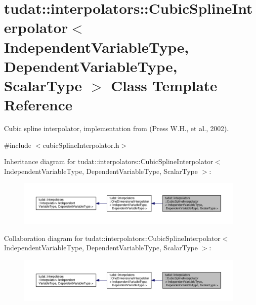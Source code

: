\hypertarget{classtudat_1_1interpolators_1_1CubicSplineInterpolator}{}\section{tudat\+:\+:interpolators\+:\+:Cubic\+Spline\+Interpolator$<$ Independent\+Variable\+Type, Dependent\+Variable\+Type, Scalar\+Type $>$ Class Template Reference}
\label{classtudat_1_1interpolators_1_1CubicSplineInterpolator}


Cubic spline interpolator, implementation from (Press W.\+H., et al., 2002).  




{\ttfamily \#include $<$cubic\+Spline\+Interpolator.\+h$>$}



Inheritance diagram for tudat\+:\+:interpolators\+:\+:Cubic\+Spline\+Interpolator$<$ Independent\+Variable\+Type, Dependent\+Variable\+Type, Scalar\+Type $>$\+:
\nopagebreak
\begin{figure}[H]
\begin{center}
\leavevmode
\includegraphics[width=350pt]{classtudat_1_1interpolators_1_1CubicSplineInterpolator__inherit__graph}
\end{center}
\end{figure}


Collaboration diagram for tudat\+:\+:interpolators\+:\+:Cubic\+Spline\+Interpolator$<$ Independent\+Variable\+Type, Dependent\+Variable\+Type, Scalar\+Type $>$\+:
\nopagebreak
\begin{figure}[H]
\begin{center}
\leavevmode
\includegraphics[width=350pt]{classtudat_1_1interpolators_1_1CubicSplineInterpolator__coll__graph}
\end{center}
\end{figure}
